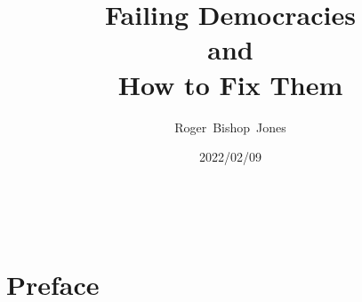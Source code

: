 \documentclass[10pt,titlepage]{book}
\title{\LARGE\bf Failing Democracies \\and \\How to Fix Them}
\author{Roger~Bishop~Jones}
\date{\small 2022/02/09}
\newcommand{\ignore}[1]{}
\begin{document}
\frontmatter

%
% 

\begin{titlepage}
\maketitle





\end{titlepage}

\ \

\ignore{
\begin{centering}
{}
\end{centering}
}%

\setcounter{tocdepth}{2}
{\parskip-0pt\tableofcontents}


\mainmatter

\pagebreak

\section*{Preface}
\end{document}
